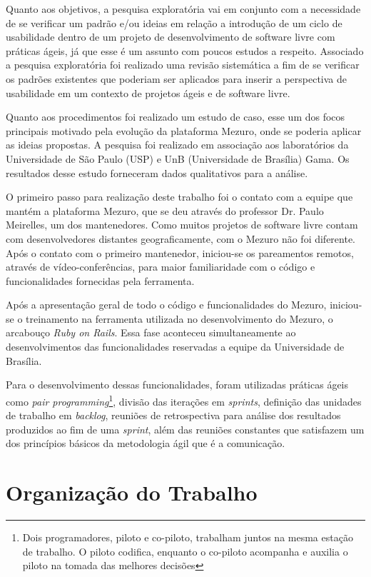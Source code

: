 Quanto aos objetivos, a pesquisa exploratória vai em conjunto com a necessidade de se verificar um padrão e/ou ideias em relação a introdução de um ciclo de usabilidade dentro de um projeto de desenvolvimento de software livre com práticas ágeis, já que esse é um assunto com poucos estudos a respeito. Associado a pesquisa exploratória foi realizado uma revisão sistemática a fim de se verificar os padrões existentes que poderiam ser aplicados para inserir a perspectiva de usabilidade em um contexto de projetos ágeis e de software livre.

Quanto aos procedimentos foi realizado um estudo de caso, esse um dos focos principais motivado pela evolução da plataforma Mezuro, onde se poderia aplicar as ideias propostas. A pesquisa foi realizado em associação aos laboratórios da Universidade de São Paulo (USP) e UnB (Universidade de Brasília) Gama. Os resultados desse estudo forneceram dados qualitativos para a análise.

O primeiro passo para realização deste trabalho foi o contato com a equipe que mantém a plataforma Mezuro, que se deu através do professor Dr. Paulo Meirelles, um dos mantenedores. Como muitos projetos de software livre contam com desenvolvedores distantes geograficamente, com o Mezuro não foi diferente. Após o contato com o primeiro mantenedor, iniciou-se os pareamentos remotos, através de vídeo-conferências, para maior familiaridade com o código e funcionalidades fornecidas pela ferramenta.

Após a apresentação geral de todo o código e funcionalidades do Mezuro, iniciou-se o treinamento na ferramenta utilizada no desenvolvimento do Mezuro, o arcabouço \textit{Ruby on Rails}. Essa fase aconteceu simultaneamente ao desenvolvimentos das funcionalidades reservadas a equipe da Universidade de Brasília.

Para o desenvolvimento dessas funcionalidades, foram utilizadas práticas ágeis como \textit{pair programming}\footnote{Dois programadores, piloto e co-piloto, trabalham juntos na mesma estação de trabalho. O piloto codifica, enquanto o co-piloto acompanha e auxilia o piloto na tomada das melhores decisões}, divisão das iterações em \textit{sprints}, definição das unidades de trabalho em \textit{backlog}, reuniões de retrospectiva para análise dos resultados produzidos ao fim de uma \textit{sprint}, além das reuniões constantes que satisfazem um dos princípios básicos da metodologia ágil que é a comunicação.

\section{Organização do Trabalho}

